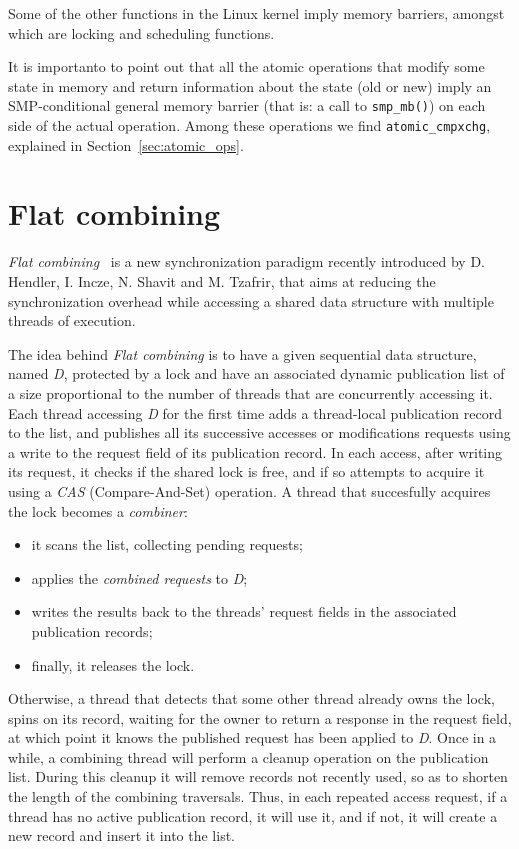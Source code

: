 Some of the other functions in the Linux kernel imply memory barriers, amongst which
are locking and scheduling functions.

It is importanto to point out that all the atomic operations that modify some state
in memory and return information about the state (old or new) imply an SMP-conditional
general memory barrier (that is: a call to  \texttt{smp\_mb()}) on each side of the
actual operation. Among these operations we find \texttt{atomic\_cmpxchg}, explained in
Section~\ref{sec:atomic_ops}.

\section{Flat combining\label{sec:flat_combining}}

\emph{Flat combining}~\cite{Hendler2010} is a new synchronization paradigm recently introduced by D. Hendler,
I. Incze, N. Shavit and M. Tzafrir, that aims at reducing the synchronization overhead while
accessing a shared data structure with multiple threads of execution.

The idea behind \emph{Flat combining} is to have a given sequential data structure, named
\emph{D}, protected by a lock and have an associated dynamic publication list of a size
proportional to the number of threads that are concurrently accessing it. Each thread accessing
\emph{D} for the first time adds a thread-local publication record to the list, and publishes
all its successive accesses or modifications requests using a write to the request field
of its publication record. In each access, after writing its request, it checks if the shared
lock is free, and if so attempts to acquire it using a \emph{CAS} (Compare-And-Set) operation.
A thread that succesfully acquires the lock becomes a \emph{combiner}: 

\begin{itemize}
\item it scans the list, collecting pending requests;
\item applies the \emph{combined requests} to \emph{D};
\item writes the results back to the threads' request fields in the associated publication records;
\item finally, it releases the lock.
\end{itemize}

Otherwise, a thread that detects that some other thread already owns the lock, spins on its record,
waiting for the owner to return a response in the request field, at which point it knows the
published request has been applied to \emph{D}. Once in a while, a combining thread will
perform a cleanup operation on the publication list. During this cleanup it will remove records
not recently used, so as to shorten the length of the combining traversals. Thus, in each repeated
access request, if a thread has no active publication record, it will use it, and if not, it will
create a new record and insert it into the list.

